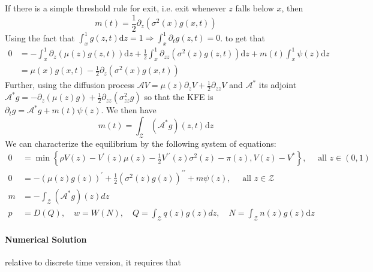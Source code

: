 \documentclass[11pt,a4paper]{article}
\begin{document}
If there is a simple threshold rule for exit, i.e. exit whenever $z$ falls below $x$, then \begin{equation}
  m(t) = \frac{1}{2}\partial_z (\sigma^2 (x) g(x,t))
\end{equation}
Using the fact that $\int_x^1 g(z,t)\mathrm{d}z=1\Rightarrow \int_x^1 \partial_t g(z,t) = 0$.  
to get that 
\begin{equation}
  \begin{aligned}
     0 & = -\int_x^1 \partial_z (\mu(z)g(z,t))\mathrm{d}z + \frac{1}{2}\int_x^1 \partial_{zz}(\sigma^2 (z)g(z,t))\mathrm{d}z + m(t)\int_x^1 \psi(z)\mathrm{d}z \\
      &= \mu(x)g(x,t) - \frac{1}{2}\partial_z (\sigma^2 (x) g(x,t))
  \end{aligned}
\end{equation}
Further, using the diffusion process $\mathcal{A}V = \mu(z)\partial_z V+\frac{1}{2}\partial_{zz}V$ and $\mathcal{A}^*$ its adjoint $\mathcal{A}^* g = -\partial_z (\mu(z)g)+\frac{1}{2}\partial_{zz}(\sigma^2_{zz}g)$ so that the KFE is $\partial_t g = \mathcal{A}^* g + m(t)\psi(z)$. We then have \begin{equation}
  m(t) = \int_{\mathcal{Z}}(\mathcal{A}^* g)(z,t)\mathrm{d}z
\end{equation}
We can characterize the equilibrium by the following system of equations: 
\begin{equation}
  \begin{aligned}
  0 & =\min \left\{\rho V(z)-V^{\prime}(z) \mu(z)-\frac{1}{2} V^{\prime \prime}(z) \sigma^2(z)-\pi(z), V(z)-V^*\right\}, \quad \text { all } z \in(0,1) \\
  0 & =-(\mu(z) g(z))^{\prime}+\frac{1}{2}\left(\sigma^2(z) g(z)\right)^{\prime \prime}+m \psi(z), \quad \text { all } z \in \mathcal{Z} \\
  m & =-\int_{\mathcal{Z}}\left(\mathcal{A}^* g\right)(z) d z \\
  p & =D(Q), \quad w=W(N), \quad Q=\int_{\mathcal{Z}} q(z) g(z) d z, \quad N=\int_{\mathcal{Z}} n(z) g(z) \mathrm{d} z
  \end{aligned}
\end{equation}


\paragraph{Numerical Solution} relative to discrete time version, it requires that 





\end{document}
